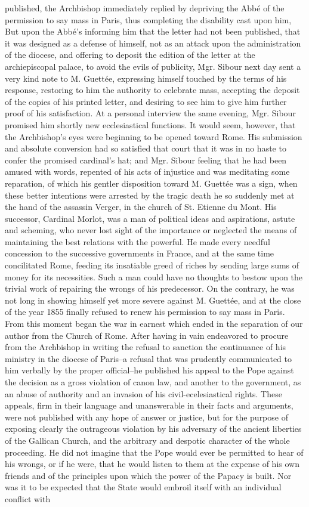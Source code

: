 published, the Archbishop immediately replied by depriving the Abbé of the permission to say mass in Paris, thus completing the disability cast upon him, But upon the Abbé's informing him that the letter had not been published, that it was designed as a defense of himself, not as an attack upon the administration of the diocese, and offering to deposit the edition of the letter at the archiepiscopal palace, to avoid the evils of publicity, Mgr. Sibour next day sent a very kind note to M. Guettée, expressing himself touched by the terms of his response, restoring to him the authority to celebrate mass, accepting the deposit of the copies of his printed letter, and desiring to see him to give him further proof of his satisfaction. At a personal interview the same evening, Mgr. Sibour promised him shortly new ecclesiastical functions. It would seem, however, that the Archbishop's eyes were beginning to be opened toward Rome. His submission and absolute conversion had so satisfied that court that it was in no haste to confer the promised cardinal's hat; and Mgr. Sibour feeling that he had been amused with words, repented of his acts of injustice and was meditating some reparation, of which his gentler disposition toward M. Guettée was a sign, when these better intentions were arrested by the tragic death he so suddenly met at the hand of the assassin Verger, in the church of St. Etienne du Mont. His successor, Cardinal Morlot, was a man of political ideas and aspirations, astute and scheming, who never lost sight of the importance or neglected the means of maintaining the best relations with the powerful. He made every needful concession to the successive governments in France, and at the same time concilitated Rome, feeding its insatiable greed of riches by sending large sums of money for its necessities. Such a man could have no thoughts to bestow upon the trivial work of repairing the wrongs of his predecessor. On the contrary, he was not long in showing himself yet more severe against M. Guettée, and at the close of the year 1855 finally refused to renew his permission to say mass in Paris. From this moment began the war in earnest which ended in the separation of our author from the Church of Rome. After having in vain endeavored to procure from the Archbishop in writing the refusal to sanction the continuance of his ministry in the diocese of Paris--a refusal that was prudently communicated to him verbally by the proper official--he published his appeal to the Pope against the decision as a gross violation of canon law, and another to the government, as an abuse of authority and an invasion of his civil-ecelesiastical rights. These appeals, firm in their language and unanswerable in their facts and arguments, were not published with any hope of answer or justice, but for the purpose of exposing clearly the outrageous violation by his adversary of the ancient liberties of the Gallican Church, and the arbitrary and despotic character of the whole proceeding. He did not imagine that the Pope would ever be permitted to hear of his wrongs, or if he were, that he would listen to them at the expense of his own friends and of the principles upon which the power of the Papacy is built. Nor was it to be expected that the State would embroil itself with an individual conflict with 